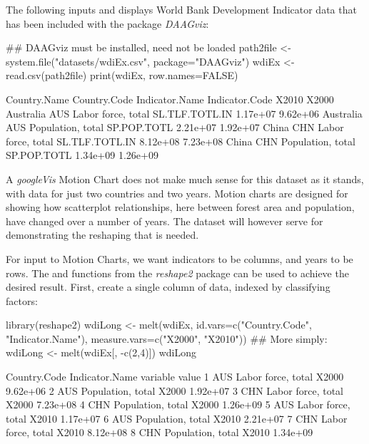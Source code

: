 The following inputs and displays World Bank Development Indicator
data that has been included with the package {\em DAAGviz}:
\begin{fullwidth}
\small
\begin{Schunk}
\begin{Sinput}
## DAAGviz must be installed, need not be loaded
path2file <- system.file("datasets/wdiEx.csv", package="DAAGviz")
wdiEx <- read.csv(path2file)
print(wdiEx, row.names=FALSE)
\end{Sinput}
\begin{Soutput}
 Country.Name Country.Code     Indicator.Name Indicator.Code    X2010    X2000
    Australia          AUS Labor force, total SL.TLF.TOTL.IN 1.17e+07 9.62e+06
    Australia          AUS  Population, total    SP.POP.TOTL 2.21e+07 1.92e+07
        China          CHN Labor force, total SL.TLF.TOTL.IN 8.12e+08 7.23e+08
        China          CHN  Population, total    SP.POP.TOTL 1.34e+09 1.26e+09
\end{Soutput}
\end{Schunk}
\end{fullwidth}

A {\em googleVis} Motion Chart does not make much sense for this
dataset as it stands, with data for just two countries and two years.
Motion charts are designed for showing how scatterplot relationships,
here between forest area and population, have changed over a number of
years.  The dataset will however serve for demonstrating the reshaping
that is needed.

For input to Motion Charts, we want indicators to be
columns, and years to be rows.  The  and
  functions from the {\em reshape2}
  package can be used to achieve the desired result.  First, create a
  single column of data, indexed by classifying factors:
\begin{Schunk}
\begin{Sinput}
library(reshape2)
wdiLong <- melt(wdiEx, id.vars=c("Country.Code",
                "Indicator.Name"),
                measure.vars=c("X2000", "X2010"))
## More simply: wdiLong <- melt(wdiEx[, -c(2,4)])
wdiLong
\end{Sinput}
\begin{Soutput}
  Country.Code     Indicator.Name variable    value
1          AUS Labor force, total    X2000 9.62e+06
2          AUS  Population, total    X2000 1.92e+07
3          CHN Labor force, total    X2000 7.23e+08
4          CHN  Population, total    X2000 1.26e+09
5          AUS Labor force, total    X2010 1.17e+07
6          AUS  Population, total    X2010 2.21e+07
7          CHN Labor force, total    X2010 8.12e+08
8          CHN  Population, total    X2010 1.34e+09
\end{Soutput}
\end{Schunk}

